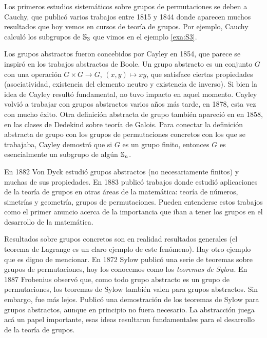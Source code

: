 Los primeros estudios sistemáticos sobre grupos de permutaciones se deben a Cauchy, que publicó varios trabajos entre 1815 y 1844 donde aparecen muchos resultados 
que hoy vemos en cursos de teoría de grupos. Por ejemplo, Cauchy calculó 
los subgrupos de $\mathbb{S}_3$ que vimos en el ejemplo \ref{exa:S3}. 

Los grupos abstractos fueron concebidos por Cayley en 1854, que parece se
inspiró en los trabajos abstractos de Boole. Un grupo abstracto es un conjunto
$G$ con una operación $G\times G\to G$, $(x,y)\mapsto xy$, que satisface
ciertas propiedades (asociatividad, existencia del elemento neutro 
y existencia de inverso). Si bien la idea de Cayley 
resultó fundamental, no tuvo impacto en aquel momento. Cayley volvió a trabajar
con grupos abstractos varios años más tarde, en 1878, esta vez con mucho éxito. 
Otra definición abstracta de grupo 
también apareció en en 1858, en las clases de Dedekind sobre teoría de Galois. Para conectar
la definición abstracta de grupo con los grupos de permutaciones concretos con los que 
se trabajaba, 
Cayley demostró que si $G$ es un grupo finito, entonces
$G$ es esencialmente un subgrupo de algún $\mathbb{S}_n$. 

En 1882 Von Dyck estudió grupos abstractos (no necesariamente finitos) y muchas de sus propiedades. En 1883 publicó trabajos donde estudió aplicaciones de la teoría de
grupos en otras áreas de la matemática: teoría de números, simetrías y geometría, grupos de permutaciones. Pueden entenderse estos trabajos como el primer anuncio
acerca de la importancia que iban a tener los grupos en el desarrollo de la matemática.  

Resultados sobre grupos concretos son en realidad resultados generales (el teorema de Lagrange es un claro ejemplo de este fenómeno). Hay otro ejemplo que es digno de mencionar. En 1872 Sylow
publicó una serie de teoremas sobre grupos de permutaciones, hoy los conocemos como
los \emph{teoremas de Sylow}. En 1887 Frobenius observó que, como todo grupo abstracto es un grupo de permutaciones, los teoremas de Sylow también valen para grupos abstractos. Sin embargo, fue más lejos. Publicó una demostración de los teoremas de Sylow para grupos abstractos, aunque en principio no fuera necesario. La abstracción juega acá un papel importante, esas ideas resultaron fundamentales 
para el desarrollo de la teoría de grupos. 

